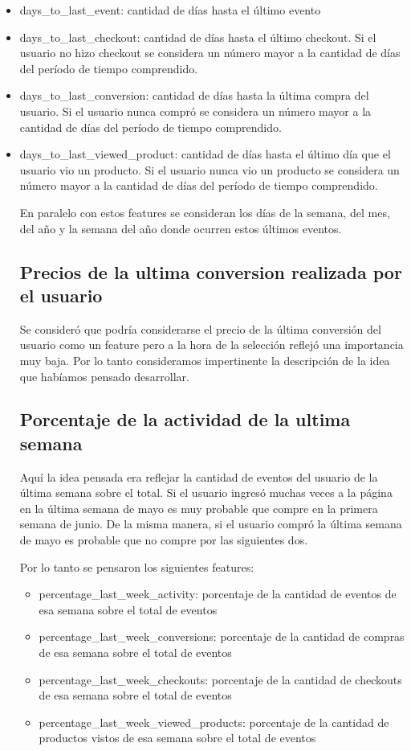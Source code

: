 \documentclass[a4paper]{article}
\begin{document}
\begin{itemize}
	\item days\_to\_last\_event: cantidad de días hasta el último evento
	\item days\_to\_last\_checkout: cantidad de días hasta el último checkout. Si el usuario no hizo checkout se considera un número mayor a la cantidad de días del período de tiempo comprendido.
	\item days\_to\_last\_conversion: cantidad de días hasta la última compra del usuario. Si el usuario nunca compró se considera un número mayor a la cantidad de días del período de tiempo comprendido.
	\item days\_to\_last\_viewed\_product: cantidad de días hasta el último día que el usuario vio un producto. Si el usuario nunca vio un producto se considera un número mayor a la cantidad de días del período de tiempo comprendido.
	
En paralelo con estos features se consideran los días de la semana, del mes, del año y la semana del año donde ocurren estos últimos eventos.	
	
\subsection{Precios de la ultima conversion realizada por el usuario}

Se consideró que podría considerarse el precio de la última conversión del usuario como un feature pero a la hora de la selección reflejó una importancia muy baja. Por lo tanto consideramos impertinente la descripción de la idea que habíamos pensado desarrollar.

\subsection{Porcentaje de la actividad de la ultima semana}

Aquí la idea pensada era reflejar la cantidad de eventos del usuario de la última semana sobre el total. Si el usuario ingresó muchas veces a la página en la última semana de mayo es muy probable que compre en la primera semana de junio. De la misma manera, si el usuario compró la última semana de mayo es probable que no compre por las siguientes dos.

Por lo tanto se pensaron los siguientes features:
\begin{itemize}
	\item percentage\_last\_week\_activity: porcentaje de la cantidad de eventos de esa semana sobre el total de eventos
	\item percentage\_last\_week\_conversions:  porcentaje de la cantidad de compras de esa semana sobre el total de eventos
	\item percentage\_last\_week\_checkouts: porcentaje de la cantidad de checkouts de esa semana sobre el total de eventos
	\item percentage\_last\_week\_viewed\_products: porcentaje de la cantidad de productos vistos de esa semana sobre el total de eventos
	

\end{itemize}
\end{itemize}
\end{document}
